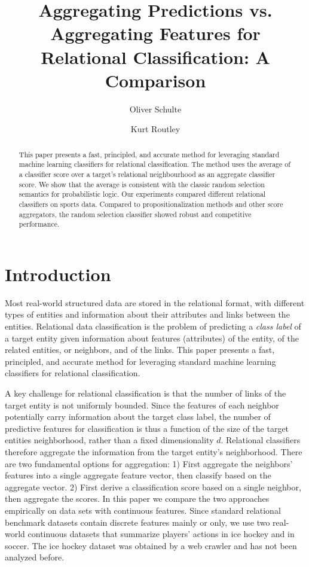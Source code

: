 \documentclass[oribibl]{llncs}%
\institute{School of Computing Science,   Simon Fraser University,\\ Burnaby,
B.C.,   Canada~V5A~1S6,   \email{oschulte@cs.sfu.ca,kdr4@sfu.ca}   }
\begin{document}
\title{Aggregating Predictions vs. Aggregating Features for Relational Classification: A Comparison}
\author{Oliver Schulte
\and Kurt Routley}
\maketitle


\begin{abstract} This paper presents a fast, principled, and accurate method for leveraging standard machine learning classifiers for relational classification. The method uses the average of a classifier score over a target's relational neighbourhood as an aggregate classifier score. We show that the average is consistent with the classic random selection semantics for probabilistic logic. Our experiments compared different relational classifiers on sports data. Compared to propositionalization methods and other score aggregators, the random selection classifier showed robust and competitive performance. 
\end{abstract}


\section{Introduction} Most real-world structured data are stored in the relational format, with different types of entities and information about their attributes and links between the entities.
Relational data classification is the problem of predicting a {\em class label} of a target entity given information about features (attributes) of the entity, of the related entities, or neighbors, and of the links. This paper presents a fast, principled, and accurate method for leveraging standard machine learning classifiers for relational classification.

A key challenge for relational classification is that the number of links of the target entity is not uniformly bounded. Since the features of each neighbor potentially carry information about the target class label, the number of predictive features for classification is thus a function of the size of the target entities neighborhood, rather than a fixed dimensionality $d$. Relational classifiers therefore aggregate the information from the target entity's neighborhood. There are two fundamental options for aggregation: 1) First aggregate the neighbors' features into a single aggregate feature vector, then classify based on the aggregate vector. 2) First derive a classification score based on a single neighbor, then aggregate the scores. 
%
In this paper we compare the two approaches empirically on data sets with continuous features. Since standard relational benchmark datasets contain discrete features mainly or only, we use two real-world continuous datasets that summarize players' actions in ice hockey and in soccer. The ice hockey dataset was obtained by a web crawler and has not been analyzed before.
\end{document}
